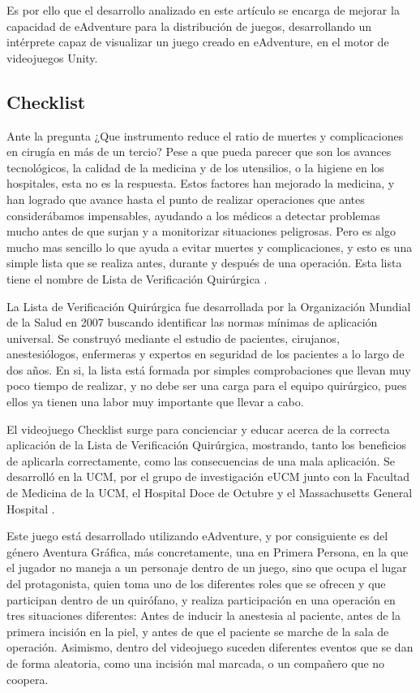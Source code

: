 Es por ello que el desarrollo analizado en este artículo se encarga de mejorar la capacidad de eAdventure para la distribución de juegos, desarrollando un intérprete capaz de visualizar un juego creado en eAdventure, en el motor de videojuegos Unity. 


\subsection{Checklist}
\label{checklist}

Ante la pregunta ¿Que instrumento reduce el ratio de muertes y complicaciones en cirugía en más de un tercio? Pese a que pueda parecer que son los avances tecnológicos, la calidad de la medicina y de los utensilios, o la higiene en los hospitales, esta no es la respuesta. Estos factores han mejorado la medicina, y han logrado que avance hasta el punto de realizar operaciones que antes considerábamos impensables, ayudando a los médicos a detectar problemas mucho antes de que surjan y a monitorizar situaciones peligrosas. Pero es algo mucho mas sencillo lo que ayuda a evitar muertes y complicaciones, y esto es una simple lista que se realiza antes, durante y después de una operación. Esta lista tiene el nombre de Lista de Verificación Quirúrgica \cite{baltaslide}.

La Lista de Verificación Quirúrgica fue desarrollada por la Organización Mundial de la Salud en 2007 buscando identificar las normas mínimas de aplicación universal. Se construyó mediante el estudio de pacientes, cirujanos, anestesiólogos, enfermeras y expertos en seguridad de los pacientes a lo largo de dos años. En si, la lista está formada por simples comprobaciones que llevan muy poco tiempo de realizar, y no debe ser una carga para el equipo quirúrgico, pues ellos ya tienen una labor muy importante que llevar a cabo.

El videojuego Checklist surge para concienciar y educar acerca de la correcta aplicación de la Lista de Verificación Quirúrgica, mostrando, tanto los beneficios de aplicarla correctamente, como las consecuencias de una mala aplicación. Se desarrolló en la UCM, por el grupo de investigación eUCM junto con la Facultad de Medicina de la UCM, el Hospital Doce de Octubre y el Massachusetts General Hospital \cite{checklisteucm}.

Este juego está desarrollado utilizando eAdventure, y por consiguiente es del género Aventura Gráfica, más concretamente, una en Primera Persona, en la que el jugador no maneja a un personaje dentro de un juego, sino que ocupa el lugar del protagonista, quien toma uno de los diferentes roles que se ofrecen y que participan dentro de un quirófano, y realiza participación en una operación en tres situaciones diferentes: Antes de inducir la anestesia al paciente, antes de la primera incisión en la piel, y antes de que el paciente se marche de la sala de operación. Asimismo, dentro del videojuego suceden diferentes eventos que se dan de forma aleatoria, como una incisión mal marcada, o un compañero que no coopera.

